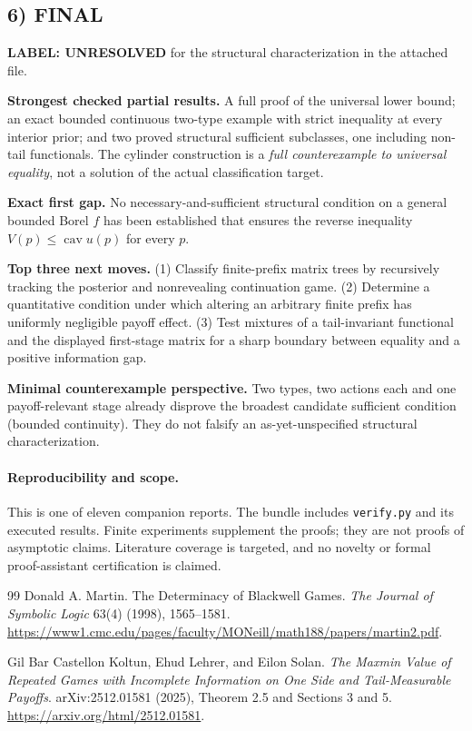 \documentclass[11pt,a4paper]{article}
\theoremstyle{definition}
\theoremstyle{remark}
\begin{document}
\subsection*{6) FINAL}
\textbf{LABEL: UNRESOLVED} for the structural characterization in the attached file.

\textbf{Strongest checked partial results.} A full proof of the universal lower bound; an exact bounded continuous two-type example with strict inequality at every interior prior; and two proved structural sufficient subclasses, one including non-tail functionals. The cylinder construction is a \emph{full counterexample to universal equality}, not a solution of the actual classification target.

\textbf{Exact first gap.} No necessary-and-sufficient structural condition on a general bounded Borel $f$ has been established that ensures the reverse inequality $V(p)\leq\operatorname{cav}u(p)$ for every $p$.

\textbf{Top three next moves.} (1) Classify finite-prefix matrix trees by recursively tracking the posterior and nonrevealing continuation game. (2) Determine a quantitative condition under which altering an arbitrary finite prefix has uniformly negligible payoff effect. (3) Test mixtures of a tail-invariant functional and the displayed first-stage matrix for a sharp boundary between equality and a positive information gap.

\textbf{Minimal counterexample perspective.} Two types, two actions each and one payoff-relevant stage already disprove the broadest candidate sufficient condition (bounded continuity). They do not falsify an as-yet-unspecified structural characterization.

\paragraph{Reproducibility and scope.} This is one of eleven companion reports. The bundle includes \texttt{verify.py} and its executed results. Finite experiments supplement the proofs; they are not proofs of asymptotic claims. Literature coverage is targeted, and no novelty or formal proof-assistant certification is claimed.

\begin{thebibliography}{99}
\small
{}
Donald A. Martin. The Determinacy of Blackwell Games.
\emph{The Journal of Symbolic Logic} 63(4) (1998), 1565--1581.
\url{https://www1.cmc.edu/pages/faculty/MONeill/math188/papers/martin2.pdf}.

Gil Bar Castellon Koltun, Ehud Lehrer, and Eilon Solan.
\emph{The Maxmin Value of Repeated Games with Incomplete Information on One Side and Tail-Measurable Payoffs}.
arXiv:2512.01581 (2025), Theorem 2.5 and Sections 3 and 5.
\url{https://arxiv.org/html/2512.01581}.

\end{thebibliography}
\end{document}
